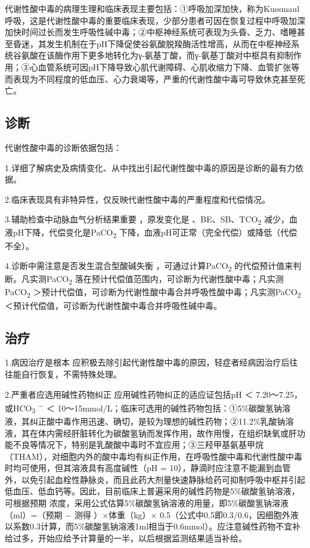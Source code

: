 代谢性酸中毒的病理生理和临床表现主要包括：①呼吸加深加快，称为Kussmaul呼吸，这是代谢性酸中毒的重要临床表现，少部分患者可因在恢复过程中呼吸加深加快时间过长而发生呼吸性碱中毒；②中枢神经系统可表现为头昏、乏力、嗜睡甚至昏迷，其发生机制在于pH下降促使谷氨酸脱羧酶活性增高，从而在中枢神经系统谷氨酸在该酶作用下更多地转化为γ-氨基丁酸，而γ-氨基丁酸对中枢具有抑制作用；③心血管系统可因pH下降导致心肌代谢障碍、心肌收缩力下降、血管扩张等而表现为不同程度的低血压、心力衰竭等，严重的代谢性酸中毒可导致休克甚至死亡。

\subsection{诊断}

代谢性酸中毒的诊断依据包括：

1.详细了解病史及病情变化、从中找出引起代谢性酸中毒的原因是诊断的最有力依据。

2.临床表现具有非特异性，仅反映代谢性酸中毒的严重程度和代偿情况。

3.辅助检查中动脉血气分析结果重要 ，原发变化是{}
、BE、SB、TCO\textsubscript{2}
减少，血液pH下降，代偿变化是PaCO\textsubscript{2}
下降，血液pH可正常（完全代偿）或降低（代偿不全）。

4.诊断中需注意是否发生混合型酸碱失衡 ，可通过计算PaCO\textsubscript{2}
的代偿预计值来判断。凡实测PaCO\textsubscript{2}
落在预计代偿值范围内，可诊断为代谢性酸中毒；凡实测PaCO\textsubscript{2}
＞预计代偿值，可诊断为代谢性酸中毒合并呼吸性酸中毒；凡实测PaCO\textsubscript{2}
＜预计代偿值，可诊断为代谢性酸中毒合并呼吸性碱中毒。

\subsection{治疗}

1.病因治疗是根本
应积极去除引起代谢性酸中毒的原因，轻症者经病因治疗后往往能自行恢复，不需特殊处理。

2.严重者应选用碱性药物纠正 应用碱性药物纠正的适应证包括pH ＜
7.20～7.25，或HCO\textsubscript{3} \textsuperscript{−} ＜
10～15mmol/L；临床可选用的碱性药物包括：①5\%碳酸氢钠溶液，其纠正酸中毒作用迅速、确切，是较为理想的碱性药物；②11.2\%乳酸钠溶液，其在体内需经肝脏转化为碳酸氢钠而发挥作用，故作用慢，在组织缺氧或肝功能不良等情况下，特别是乳酸酸中毒时不宜应用；③三羟甲基氨基甲烷（THAM），对细胞内外的酸中毒均有纠正作用，在呼吸性酸中毒和代谢性酸中毒时均可使用，但其溶液具有高度碱性（pH
=
10），静滴时应注意不能漏到血管外，以免引起血栓性静脉炎，而且此药大剂量快速静脉给药可抑制呼吸中枢并引起低血压、低血钙等。因此，目前临床上普遍采用的碱性药物是5\%碳酸氢钠溶液，可根据预期{}
浓度，采用公式估算5\%碳酸氢钠溶液的用量，即5\%碳酸氢钠溶液（ml）=（预期{}
− 测得{} ）×体重（kg）×
0.5（公式中0.5即0.3/0.6，因细胞外液以系数0.3计算，而5\%碳酸氢钠溶液1ml相当于0.6mmol）。应注意碱性药物不宜补给过多，开始应给予计算量的一半，以后根据监测结果适当补给。

